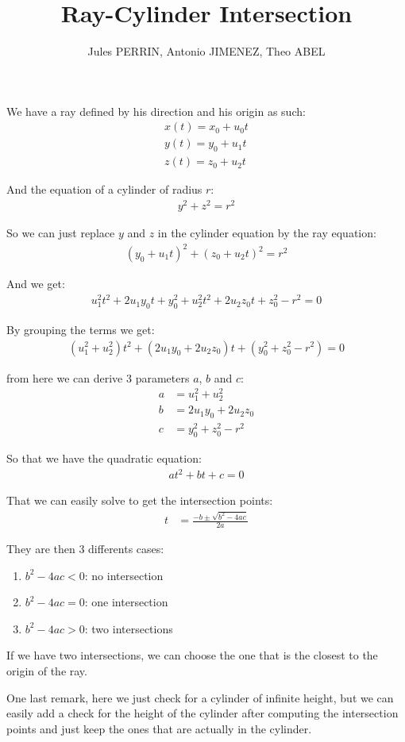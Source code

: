 \documentclass[12pt]{article}
\title{Ray-Cylinder Intersection}
\author{Jules PERRIN, Antonio JIMENEZ, Theo ABEL}
\begin{document}
\maketitle

We have a ray defined by his direction and his origin as such:
\begin{align*}
    x(t) = x_0 + u_0 t \\
    y(t) = y_0 + u_1 t \\
    z(t) = z_0 + u_2 t
\end{align*}

And the equation of a cylinder of radius $r$:
\begin{align*}
    y^2 + z^2 = r^2
\end{align*}

So we can just replace $y$ and $z$ in the cylinder equation by the ray equation:
\begin{align*}
    (y_0 + u_1 t)^2 + (z_0 + u_2 t)^2 = r^2
\end{align*}

And we get:
\begin{align*}
    u_1^2 t^2 + 2 u_1 y_0 t + y_0^2 + u_2^2 t^2 + 2 u_2 z_0 t + z_0^2 - r^2 = 0
\end{align*}

By grouping the terms we get:
\begin{align*}
    (u_1^2 + u_2^2)t^2 + (2 u_1 y_0 + 2 u_2 z_0)t + (y_0^2 + z_0^2 - r^2) = 0
\end{align*}

from here we can derive 3 parameters $a$, $b$ and $c$:
\begin{align*}
    a &= u_1^2 + u_2^2 \\
    b &= 2 u_1 y_0 + 2 u_2 z_0 \\
    c &= y_0^2 + z_0^2 - r^2
\end{align*}

So that we have the quadratic equation:
\begin{align*}
    at^2 + bt + c = 0
\end{align*}

That we can easily solve to get the intersection points:
\begin{align*}
    t &= \frac{-b \pm \sqrt{b^2 - 4ac}}{2a}
\end{align*}

They are then 3 differents cases:
\begin{enumerate}
    \item $b^2 - 4ac < 0$: no intersection
    \item $b^2 - 4ac = 0$: one intersection
    \item $b^2 - 4ac > 0$: two intersections
\end{enumerate}

If we have two intersections, we can choose the one that is the closest to the origin of the ray.

One last remark, here we just check for a cylinder of infinite height, but we can easily add a check for the height of the cylinder
after computing the intersection points and just keep the ones that are actually in the cylinder.
\end{document}
